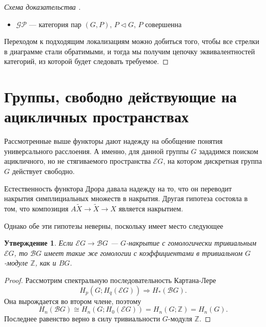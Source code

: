 \documentclass[14pt, dvipsnames]{extarticle}
\newtheorem{statement}{Утверждение}
\theoremstyle{definition}
\theoremstyle{remark}
\begin{document}
\begin{enumerate}[i)]
\begin{proof}[Схема доказательства \cite{Deleanu}]
\begin{itemize}
\item $\mathscr{GP}$ --- категория пар $(G, P)$, $P\vartriangleleft G$, $P$ совершенна

\end{itemize}

Переходом к подходящим локализациям можно добиться того, чтобы все стрелки в диаграмме стали обратимыми, и тогда мы получим цепочку эквивалентностей категорий, из которой будет следовать требуемое.
\end{proof}







\end{enumerate}








\section{Группы, свободно действующие на ацикличных пространствах}


Рассмотренные выше функторы дают надежду на обобщение понятия универсального расслоения. А именно, для данной группы $G$ зададимся поиском ацикличного, но не стягиваемого пространства $\mathcal{E}G$, на котором дискретная группа $G$ действует свободно.

Естественность функтора Дрора давала надежду на то, что он переводит накрытия симплициальных множеств в накрытия. Другая гипотеза состояла в том, что композиция $A\widetilde{X}\to \widetilde{X}\to X$ является накрытием.  

Однако обе эти гипотезы неверны, поскольку имеет место следующее

\begin{statement}
Если $\mathcal{E}G\to \mathcal{B}G$ --- $G$-накрытие с гомологически тривиальным $\mathcal{E}G$, то $\mathcal{B}G$ имеет такие же гомологии с коэффициентами в тривиальном $G$-модуле $\mathbb{Z}$, как и $BG$.
\end{statement}

\begin{proof}
Рассмотрим спектральную последовательность Картана-Лере $$H_p(G; H_q(\mathcal{E}G))\Rightarrow H_\ast(\mathcal{B}G).$$ Она вырождается во втором члене, поэтому $$H_n(\mathcal{B}G)\cong H_n(G; H_0(\mathcal{E}G)) = H_n(G; \mathbb{Z}) = H_n(G).$$ Последнее равенство верно в силу тривиальности $G$-модуля $\mathbb{Z}$.
\end{proof}
\end{document}
